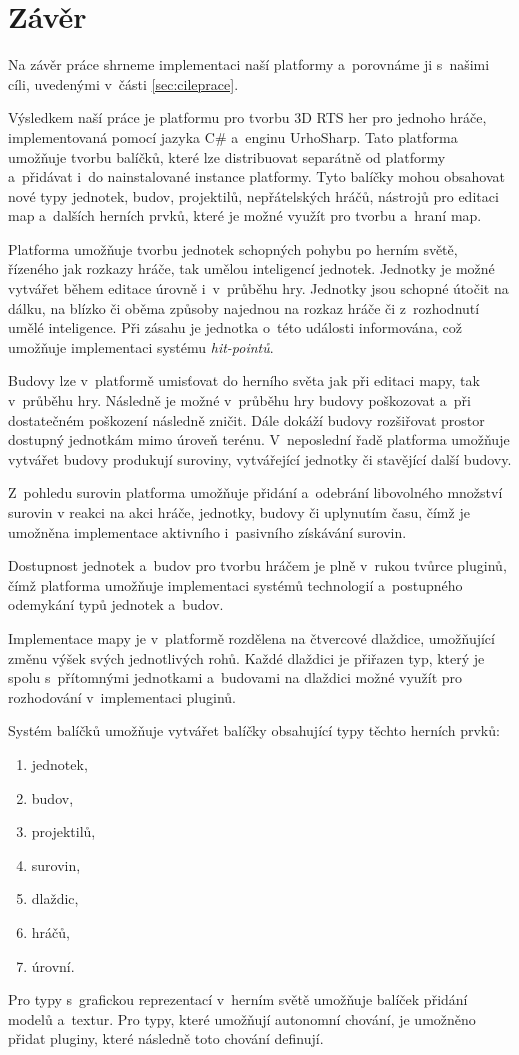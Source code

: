 \chapter*{Závěr}
Na závěr práce shrneme implementaci naší platformy a~porovnáme ji s~našimi cíli, uvedenými v~části \ref{sec:cileprace}.

Výsledkem naší práce je platformu pro tvorbu 3D RTS her pro jednoho hráče, implementovaná pomocí jazyka C\# a~enginu UrhoSharp. Tato platforma umožňuje tvorbu balíčků, které lze distribuovat separátně od platformy a~přidávat i~do nainstalované instance platformy. Tyto balíčky mohou obsahovat nové typy jednotek, budov, projektilů, nepřátelských hráčů, nástrojů pro editaci map a~dalších herních prvků, které je možné využít pro tvorbu a~hraní map. 

Platforma umožňuje tvorbu jednotek schopných pohybu po herním světě, řízeného jak rozkazy hráče, tak umělou inteligencí jednotek. Jednotky je možné vytvářet během editace úrovně i~v~průběhu hry. Jednotky jsou schopné útočit na dálku, na blízko či oběma způsoby najednou na rozkaz hráče či z~rozhodnutí umělé inteligence. Při zásahu je jednotka o~této události informována, což umožňuje implementaci systému \textit{hit-pointů}.

Budovy lze v~platformě umisťovat do herního světa jak při editaci mapy, tak v~průběhu hry. Následně je možné v~průběhu hry budovy poškozovat a~při dostatečném poškození následně zničit. Dále dokáží budovy rozšiřovat prostor dostupný jednotkám mimo úroveň terénu. V~neposlední řadě platforma umožňuje vytvářet budovy produkují suroviny, vytvářející jednotky či stavějící další budovy.

Z~pohledu surovin platforma umožňuje přidání a~odebrání libovolného množství surovin v reakci na akci hráče, jednotky, budovy či uplynutím času, čímž je umožněna implementace aktivního i~pasivního získávání surovin.

Dostupnost jednotek a~budov pro tvorbu hráčem je plně v~rukou tvůrce pluginů, čímž platforma umožňuje implementaci systémů technologií a~postupného odemykání typů jednotek a~budov.

Implementace mapy je v~platformě rozdělena na čtvercové dlaždice, umožňující změnu výšek svých jednotlivých rohů. Každé dlaždici je přiřazen typ, který je spolu s~přítomnými jednotkami a~budovami na dlaždici možné využít pro rozhodování v~implementaci pluginů.

Systém balíčků umožňuje vytvářet balíčky obsahující typy těchto herních prvků:
\begin{enumerate}
	\item jednotek,
	\item budov,
	\item projektilů,
	\item surovin,
	\item dlaždic,
	\item hráčů,
	\item úrovní.	
\end{enumerate} 
Pro typy s~grafickou reprezentací v~herním světě umožňuje balíček přidání modelů a~textur. Pro typy, které umožňují autonomní chování, je umožněno přidat pluginy, které následně toto chování definují.

